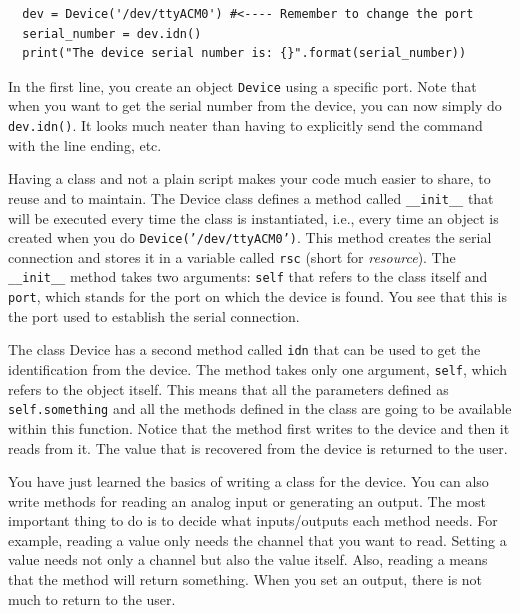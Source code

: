 \begin{verbatim}
  dev = Device('/dev/ttyACM0') #<---- Remember to change the port
  serial_number = dev.idn()
  print("The device serial number is: {}".format(serial_number))
\end{verbatim}

In the first line, you create an object \texttt{Device} using a specific port. Note that when you want to get the serial number from the device, you can now simply do \texttt{dev.idn()}. It looks much neater than having to explicitly send the command with the line ending, etc.

Having a class and not a plain script makes your code much
easier to share, to reuse and to maintain. The Device class defines a method called \texttt{__init__}
that will be executed every time the class is instantiated, i.e., every
time an object is created when you do \texttt{Device('/dev/ttyACM0')}. 
This method creates the serial connection and stores it in a variable called \texttt{rsc} (short for
\emph{resource}). The \texttt{\_\_init\_\_} method takes two arguments:
\texttt{self} that refers to the class itself and \texttt{port}, which
stands for the port on which the device is found. You see that this is
the port used to establish the serial connection.

The class Device has a second method called \texttt{idn} that can be
used to get the identification from the device. The method takes only
one argument, \texttt{self}, which refers to the object itself. This
means that all the parameters defined as \texttt{self.something} and all
the methods defined in the class are going to be available within this
function. Notice that the method first writes to the device and then it reads from it. The value that is
recovered from the device is returned to the user. 



You have just learned the basics of writing a class for the device. You can also
write methods for reading an analog input or generating an output. The most important thing to do is to decide what inputs/outputs each method needs. For example, reading a value only needs the channel that you want to read. Setting a value needs not only a channel but also the value itself. Also, reading a means that the method will return something. When you set an output, there is not much to return to the user. 

